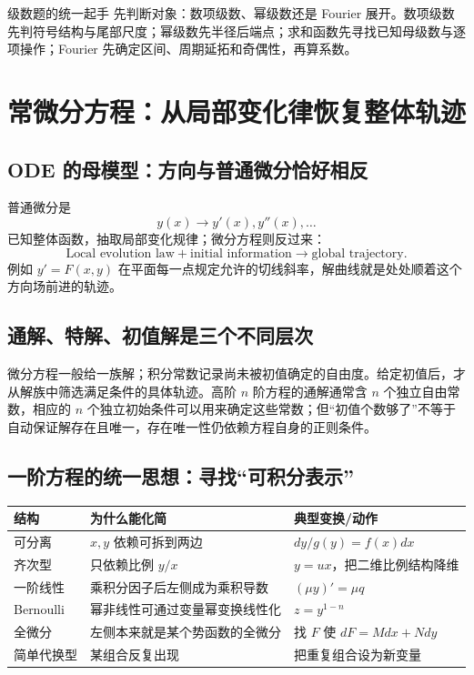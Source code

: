 \documentclass[11pt,a4paper,openany]{ctexbook}
\begin{document}
\begin{examBox}{级数题的统一起手}
先判断对象：数项级数、幂级数还是 Fourier 展开。数项级数先判符号结构与尾部尺度；幂级数先半径后端点；求和函数先寻找已知母级数与逐项操作；Fourier 先确定区间、周期延拓和奇偶性，再算系数。
\end{examBox}

\chapter{常微分方程：从局部变化律恢复整体轨迹}

\section{ODE 的母模型：方向与普通微分恰好相反}
普通微分是
\[
y(x)\longrightarrow y'(x),y''(x),\dots
\]
已知整体函数，抽取局部变化规律；微分方程则反过来：
\[
\boxed{\text{Local evolution law}+\text{initial information}\to\text{global trajectory}}.
\]
例如 $y'=F(x,y)$ 在平面每一点规定允许的切线斜率，解曲线就是处处顺着这个方向场前进的轨迹。

\section{通解、特解、初值解是三个不同层次}
微分方程一般给一族解；积分常数记录尚未被初值确定的自由度。给定初值后，才从解族中筛选满足条件的具体轨迹。高阶 $n$ 阶方程的通解通常含 $n$ 个独立自由常数，相应的 $n$ 个独立初始条件可以用来确定这些常数；但“初值个数够了”不等于自动保证解存在且唯一，存在唯一性仍依赖方程自身的正则条件。

\section{一阶方程的统一思想：寻找“可积分表示”}
\begin{longtable}{L{3.1cm}L{5.1cm}L{\dimexpr\linewidth-8.37cm\relax}}
\toprule
\textbf{结构} & \textbf{为什么能化简} & \textbf{典型变换/动作}\\
\midrule
可分离 & $x,y$ 依赖可拆到两边 & $dy/g(y)=f(x)dx$\\
齐次型 & 只依赖比例 $y/x$ & $y=ux$，把二维比例结构降维\\
一阶线性 & 乘积分因子后左侧成为乘积导数 & $(\mu y)'=\mu q$\\
Bernoulli & 幂非线性可通过变量幂变换线性化 & $z=y^{1-n}$\\
全微分 & 左侧本来就是某个势函数的全微分 & 找 $F$ 使 $dF=Mdx+Ndy$\\
简单代换型 & 某组合反复出现 & 把重复组合设为新变量\\
\bottomrule
\end{longtable}
\end{document}

